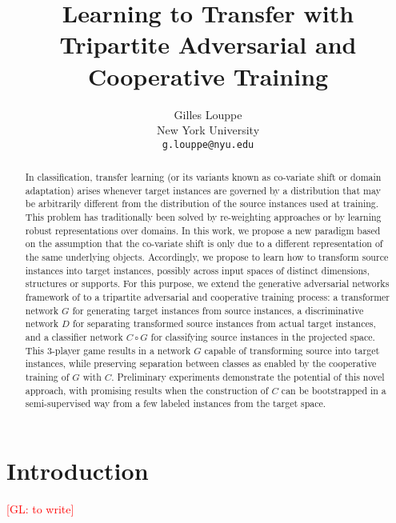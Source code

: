 \documentclass{article}
\title{Learning to Transfer with \\
Tripartite Adversarial and Cooperative Training}
\author{
Gilles Louppe \\
New York University\\
\texttt{g.louppe@nyu.edu} \\
}
\newcommand{\glnote}[1]{\textcolor{red}{[GL: #1]}}
\theoremstyle{plain}
\begin{document}
\maketitle

\begin{abstract}

In classification, transfer learning (or its variants known as co-variate shift
or domain adaptation) arises whenever target instances are governed by a
distribution that may be arbitrarily different from the distribution of the
source instances used at training. This problem has traditionally been solved by re-weighting
approaches or by learning robust representations over domains. In this work, we
propose a new paradigm based on the assumption that the co-variate shift is only
due to a different representation of the same underlying objects.
Accordingly, we propose to learn how to transform source instances into target
instances, possibly across input spaces of distinct dimensions, structures or
supports. For this purpose, we extend the generative adversarial networks
framework of \cite{goodfellow2014generative} to a tripartite adversarial and cooperative training process: a
transformer network $G$ for generating target instances from source instances, a
discriminative network $D$ for separating transformed source instances from
actual target instances, and a classifier network $C \circ G$ for classifying source
instances in the projected space. This 3-player game results in a network $G$
capable of transforming source into target instances, while preserving
separation between classes as enabled by the cooperative training of $G$ with $C$.
Preliminary experiments demonstrate the potential of this novel approach, with promising
results when the construction of $C$ can be bootstrapped in a semi-supervised
way  from a few labeled instances from the target space.

\end{abstract}

\section{Introduction}

\glnote{to write}

\end{document}
